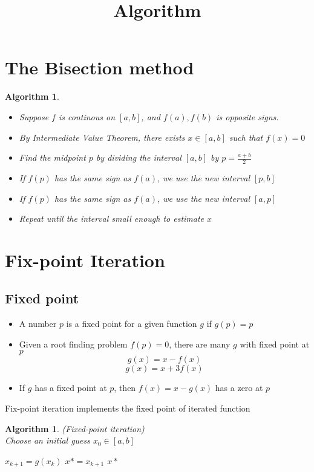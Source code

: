 \documentclass[12pt]{article}
\title{Algorithm}
\newtheorem{alg}[theorem]{Algorithm}
\begin{document}
\maketitle
\tableofcontents
\newpage

\section{The Bisection method}
\begin{alg}
\begin{itemize}
	\item Suppose $f$ is continous on $[a,b]$, and $f(a),f(b)$ is opposite signs.
	\item By Intermediate Value Theorem, there exists $x \in [a,b]$ such that $f(x) = 0$
	\item Find the midpoint $p$ by dividing the interval $[a,b]$ by $p = \frac{a+b}{2}$
	\item If $f(p)$ has the same sign as $f(a)$, we use the new interval $[p,b]$
	\item If $f(p)$ has the same sign as $f(a)$, we use the new interval $[a,p]$
	\item Repeat until the interval small enough to estimate $x$
	
\end{itemize}
\end{alg}






\section{Fix-point Iteration}
\subsection{Fixed point} \begin{itemize}
	\item A number $p$ is a fixed point for a given function $g$ if $g(p) = p$
	\item Given a root finding problem $f(p) = 0$, there are many $g$ with fixed point at $p$
	$$g(x) = x - f(x)$$ $$g(x) = x + 3f(x)$$
	\item If $g$ has a fixed point at $p$, then $f(x) = x -g(x)$ has a zero at $p$
\end{itemize}
Fix-point iteration implements the fixed point of iterated function \\ 
\begin{alg}(Fixed-point iteration) \\
Choose an initial guess $x_0 \in [a,b]$
\begin{algorithmic}
\State $x_{k+1} = g(x_k)$
\State $x* = x_{k+1}$
\State \Return $x*$
\EndIf
\EndFor
\end{algorithmic}

\end{alg}
\end{document}

